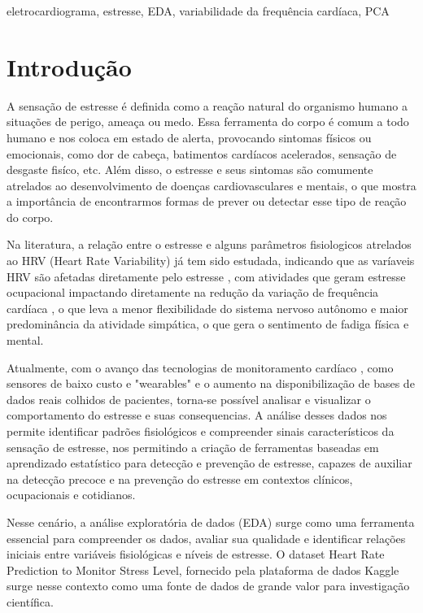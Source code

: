 \documentclass[conference]{IEEEtran}
\begin{document}
\begin{IEEEkeywords}
eletrocardiograma, estresse, EDA, variabilidade da frequência cardíaca, PCA
\end{IEEEkeywords}

\section{Introdução}
A sensação de estresse é definida como a reação natural do organismo humano a situações de perigo, ameaça ou medo. Essa ferramenta
do corpo é comum a todo humano e nos coloca em estado de alerta, provocando sintomas físicos ou emocionais, como dor de cabeça,
batimentos cardíacos acelerados, sensação de desgaste fisíco, etc. Além disso, o estresse e seus sintomas são comumente atrelados ao desenvolvimento de
doenças cardiovasculares e mentais, o que mostra a importância de encontrarmos formas de prever ou detectar esse tipo de reação
do corpo. 

Na literatura, a relação entre o estresse e alguns parâmetros fisiologicos atrelados ao HRV (Heart Rate Variability) já tem sido estudada, indicando que
as varíaveis HRV são afetadas diretamente pelo estresse \cite{b1}, com atividades que geram estresse ocupacional impactando diretamente na redução da variação de frequência
cardíaca \cite{b2}, o que leva a menor flexibilidade do sistema nervoso autônomo e maior predominância da atividade simpática, o que gera o sentimento de fadiga física e mental.

Atualmente, com o avanço das tecnologias de monitoramento cardíaco \cite{b3}, como sensores de baixo custo e "wearables" e o aumento na disponibilização de bases de dados reais colhidos de pacientes, torna-se possível
analisar e visualizar o comportamento do estresse e suas consequencias. A análise desses dados nos permite identificar padrões fisiológicos e compreender sinais característicos 
da sensação de estresse, nos permitindo a criação de ferramentas baseadas em aprendizado estatístico para detecção e prevenção de estresse, capazes de auxiliar na detecção precoce e na prevenção 
do estresse em contextos clínicos, ocupacionais e cotidianos.

Nesse cenário, a análise exploratória de dados (EDA) surge como uma ferramenta essencial para compreender os dados, avaliar sua qualidade e identificar relações iniciais entre variáveis fisiológicas e 
níveis de estresse. O dataset Heart Rate Prediction to Monitor Stress Level, fornecido pela plataforma de dados Kaggle surge nesse contexto como uma fonte de dados
de grande valor para investigação científica.
\end{document}

